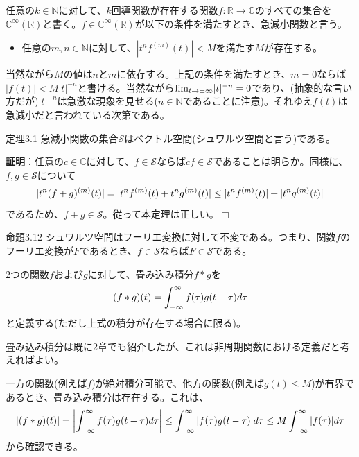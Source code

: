 \documentclass[dvipdfmx, 9pt, a4paper]{jsarticle}
\def\qed{\hfill $\Box$}
\begin{document}
\begin{tcolorbox}[title=急減小関数]
任意の$k \in \mathbb{N}$に対して、$k$回導関数が存在する関数$f:\mathbb{R} \to \mathbb{C}$のすべての集合を$\mathbb{C}^\infty(\mathbb{R})$と書く。$f \in \mathbb{C}^\infty(\mathbb{R})$が以下の条件を満たすとき、急減小関数と言う。
\begin{itemize}
\item 任意の$m, n \in \mathbb{N}$に対して、$|t^nf^{(m)}(t)|<M$を満たす$M$が存在する。
\end{itemize}
\end{tcolorbox}
当然ながら$M$の値は$n$と$m$に依存する。上記の条件を満たすとき、$m=0$ならば$|f(t)|<M|t|^{-n}$と書ける。当然ながら${\rm lim}_{t \to \pm \infty}|t|^{-n}=0$であり、(抽象的な言い方だが)$|t|^{-n}$は急激な現象を見せる($n \in \mathbb{N}$であることに注意)。それゆえ$f(t)$は急減小だと言われている次第である。\par
\begin{itembox}[l]{定理3.1}
急減小関数の集合$\mathcal{S}$はベクトル空間(シュワルツ空間と言う)である。
\end{itembox}
{\bf 証明}：任意の$c \in \mathbb{C}$に対して、$f \in \mathcal{S}$ならば$cf \in \mathcal{S}$であることは明らか。同様に、$f, g \in \mathcal{S}$について
\begin{equation}
|t^n(f+g)^{(m)}(t)|=|t^nf^{(m)}(t)+t^ng^{(m)}(t)| \leq |t^nf^{(m)}(t)| + |t^ng^{(m)}(t)| \notag
\end{equation}
であるため、$f+g \in \mathcal{S}$。従って本定理は正しい。\qed

\begin{itembox}[l]{命題3.12}
シュワルツ空間はフーリエ変換に対して不変である。つまり、関数$f$のフーリエ変換が$F$であるとき、$f \in \mathcal{S}$ならば$F \in \mathcal{S}$である。
\end{itembox}

\begin{tcolorbox}[title=畳み込み積分]
2つの関数$f$および$g$に対して、畳み込み積分$f*g$を
\begin{equation}
(f*g)(t)=\int_{-\infty}^\infty f(\tau)g(t-\tau)d\tau \notag
\end{equation}
と定義する(ただし上式の積分が存在する場合に限る)。
\end{tcolorbox}
畳み込み積分は既に2章でも紹介したが、これは非周期関数における定義だと考えればよい。\par
一方の関数(例えば$f$)が絶対積分可能で、他方の関数(例えば$g(t)\leq M$)が有界であるとき、畳み込み積分は存在する。これは、
\begin{equation}
|(f*g)(t)|=\left|\int_{-\infty}^\infty f(\tau)g(t-\tau)d\tau \right| \leq \int_{-\infty}^\infty |f(\tau)g(t-\tau)|d\tau \leq M\int_{-\infty}^\infty |f(\tau)|d\tau \notag
\end{equation}
から確認できる。
\end{document}
